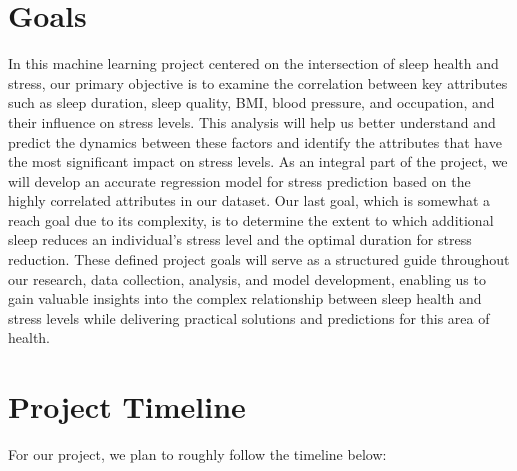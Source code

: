 \documentclass[11pt, letterpaper]{article}
\begin{document}
    \section*{Goals}
    In this machine learning project centered on the intersection of sleep health and stress, 
    our primary objective is to examine the correlation between key attributes such as sleep duration,
    sleep quality, BMI, blood pressure, and occupation, and their influence on stress levels. 
    This analysis will help us better understand and predict the dynamics between these factors and 
    identify the attributes that have the most significant impact on stress levels. 
    As an integral part of the project, we will develop an accurate regression model for stress prediction 
    based on the highly correlated attributes in our dataset. Our last goal, which is somewhat a reach goal 
    due to its complexity, is to determine the extent to which additional sleep reduces an individual's stress level 
    and the optimal duration for stress reduction. These defined project goals will serve as a structured guide 
    throughout our research, data collection, analysis, and model development, enabling us to gain valuable insights 
    into the complex relationship between sleep health and stress levels while delivering practical solutions and predictions for this area of health.

    \newpage

    \section*{Project Timeline}
    For our project, we plan to roughly follow the timeline below:
    
\end{document}
